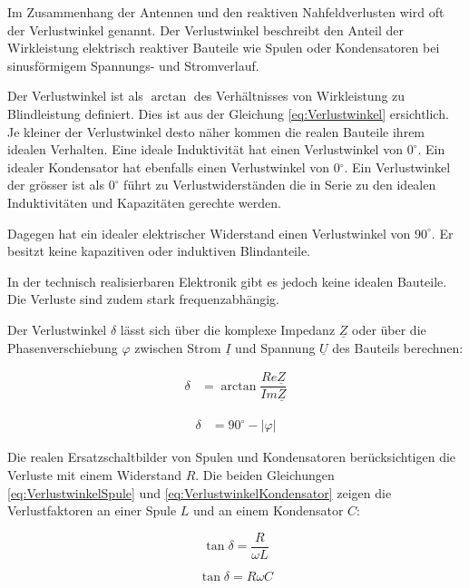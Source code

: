 Im Zusammenhang der Antennen und den reaktiven Nahfeldverlusten wird oft der Verlustwinkel genannt.  Der Verlustwinkel beschreibt den Anteil der Wirkleistung elektrisch reaktiver Bauteile wie Spulen oder Kondensatoren bei sinusförmigem Spannungs- und Stromverlauf. 

Der Verlustwinkel ist als $\arctan$ des Verhältnisses von Wirkleistung zu Blindleistung definiert. Dies ist  aus der Gleichung  \ref{eq:Verlustwinkel} ersichtlich. 
Je kleiner der Verlustwinkel desto näher kommen die realen Bauteile ihrem idealen Verhalten. Eine ideale Induktivität hat einen Verlustwinkel von $0^\circ$. Ein idealer Kondensator hat ebenfalls einen Verlustwinkel von 0$^\circ$. Ein Verlustwinkel der grösser ist als $0^\circ$ führt zu Verlustwiderständen die in Serie zu den idealen Induktivitäten und Kapazitäten gerechte werden.

Dagegen hat ein idealer elektrischer Widerstand  einen Verlustwinkel von $90^\circ$. Er besitzt keine kapazitiven oder induktiven Blindanteile.

In der technisch realisierbaren Elektronik gibt es jedoch keine idealen Bauteile. Die Verluste sind zudem stark frequenzabhängig.

Der Verlustwinkel  $\delta$  lässt sich über die komplexe Impedanz $\underline{Z}$ oder über die Phasenverschiebung  $\varphi$  zwischen Strom $\underline{I}$ und Spannung $\underline{U}$ des Bauteils berechnen: 


\label{eq:Verlustwinkel}
\begin{align}
\delta &= \arctan \dfrac{Re\underline{Z}}{Im\underline{Z}}
\end{align}

\label{eq:Verlustwinkel_aus_Phi}
\begin{align}
\delta &= 90^\circ - |\varphi|
\end{align}

Die realen Ersatzschaltbilder von Spulen und Kondensatoren berücksichtigen die Verluste mit einem Widerstand $R$.
Die beiden Gleichungen \ref{eq:VerlustwinkelSpule} und \ref{eq:VerlustwinkelKondensator} zeigen die Verlustfaktoren an einer Spule $L$ und an einem Kondensator $C$:

\begin{equation}\label{eq:VerlustwinkelSpule}
\tan \delta = \dfrac{R}{\omega L}
\end{equation}

\begin{equation} \label{eq:VerlustwinkelKondensator}
\tan \delta = R \omega C
\end{equation}

